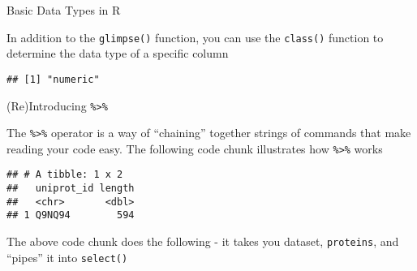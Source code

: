 \documentclass[ignorenonframetext,]{beamer}
\newenvironment{Shaded}{\begin{snugshade}}{\end{snugshade}}
\newcommand{\DecValTok}[1]{\textcolor[rgb]{0.00,0.00,0.81}{#1}}
\newcommand{\KeywordTok}[1]{\textcolor[rgb]{0.13,0.29,0.53}{\textbf{#1}}}
\newcommand{\NormalTok}[1]{#1}
\newcommand{\OperatorTok}[1]{\textcolor[rgb]{0.81,0.36,0.00}{\textbf{#1}}}
\newcommand{\StringTok}[1]{\textcolor[rgb]{0.31,0.60,0.02}{#1}}
\begin{document}
\begin{frame}[fragile]{Basic Data Types in R}
\protect\hypertarget{basic-data-types-in-r-1}{}

In addition to the \texttt{glimpse()} function, you can use the
\texttt{class()} function to determine the data type of a specific
column

\begin{Shaded}
\end{Shaded}

\begin{verbatim}
## [1] "numeric"
\end{verbatim}

\end{frame}

\begin{frame}[fragile]{(Re)Introducing \texttt{\%\textgreater{}\%}}
\protect\hypertarget{reintroducing}{}

The \texttt{\%\textgreater{}\%} operator is a way of ``chaining''
together strings of commands that make reading your code easy. The
following code chunk illustrates how \texttt{\%\textgreater{}\%} works

\begin{Shaded}
\end{Shaded}

\begin{verbatim}
## # A tibble: 1 x 2
##   uniprot_id length
##   <chr>       <dbl>
## 1 Q9NQ94        594
\end{verbatim}

The above code chunk does the following - it takes you dataset,
\texttt{proteins}, and ``pipes'' it into \texttt{select()}

\end{frame}
\end{document}
